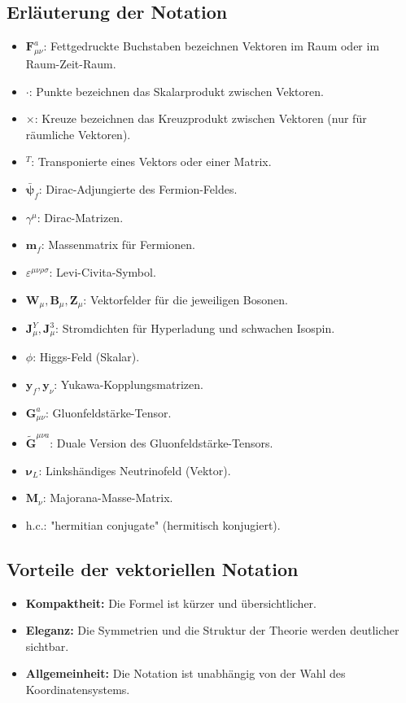\documentclass{article}
\begin{document}
	\subsection{Erläuterung der Notation}
	
	\begin{itemize}
		\item $\mathbf{F}_{\mu\nu}^a$: Fettgedruckte Buchstaben bezeichnen Vektoren im Raum oder im Raum-Zeit-Raum.
		\item $\cdot$: Punkte bezeichnen das Skalarprodukt zwischen Vektoren.
		\item $\times$: Kreuze bezeichnen das Kreuzprodukt zwischen Vektoren (nur für räumliche Vektoren).
		\item $^T$: Transponierte eines Vektors oder einer Matrix.
		\item $\bar{\boldsymbol{\psi}}_f$: Dirac-Adjungierte des Fermion-Feldes.
		\item $\gamma^\mu$: Dirac-Matrizen.
		\item $\mathbf{m}_f$: Massenmatrix für Fermionen.
		\item $\varepsilon^{\mu\nu\rho\sigma}$: Levi-Civita-Symbol.
		\item $\mathbf{W}_\mu, \mathbf{B}_\mu, \mathbf{Z}_\mu$: Vektorfelder für die jeweiligen Bosonen.
		\item $\mathbf{J}_\mu^Y, \mathbf{J}_\mu^3$: Stromdichten für Hyperladung und schwachen Isospin.
		\item $\phi$: Higgs-Feld (Skalar).
		\item $\mathbf{y}_f, \mathbf{y}_\nu$: Yukawa-Kopplungsmatrizen.
		\item $\mathbf{G}_{\mu\nu}^a$: Gluonfeldstärke-Tensor.
		\item $\tilde{\mathbf{G}}^{\mu\nu a}$: Duale Version des Gluonfeldstärke-Tensors.
		\item $\boldsymbol{\nu}_L$: Linkshändiges Neutrinofeld (Vektor).
		\item $\mathbf{M}_\nu$: Majorana-Masse-Matrix.
		\item h.c.: "hermitian conjugate" (hermitisch konjugiert).
	\end{itemize}
	
	\subsection{Vorteile der vektoriellen Notation}
	
	\begin{itemize}
		\item \textbf{Kompaktheit:} Die Formel ist kürzer und übersichtlicher.
		\item \textbf{Eleganz:} Die Symmetrien und die Struktur der Theorie werden deutlicher sichtbar.
		\item \textbf{Allgemeinheit:} Die Notation ist unabhängig von der Wahl des Koordinatensystems.
	\end{itemize}
	
\end{document}
